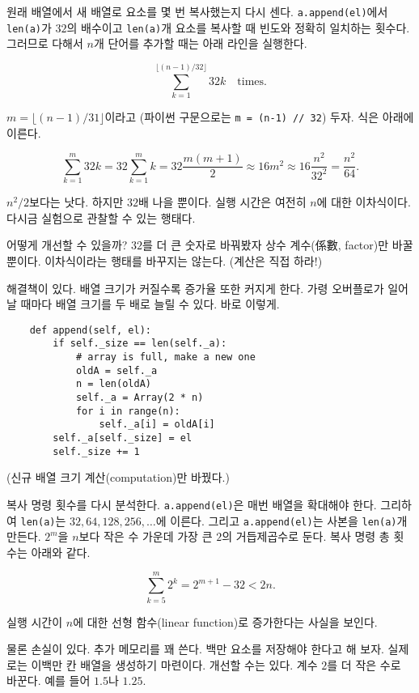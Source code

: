 \documentclass[a4paper]{oblivoir}
\begin{document}
원래 배열에서 새 배열로 요소를 몇 번 복사했는지 다시 센다. \texttt{a.append(el)}에서 \texttt{len(a)}가 $32$의 배수이고 \texttt{len(a)}개 요소를 복사할 때 빈도와 정확히 일치하는 횟수다. 그러므로 다해서 $n$개 단어를 추가할 때는 아래 라인을 실행한다.

$$\sum_{k=1}^{\lfloor(n-1)/32\rfloor}32k\quad\textrm{times.}$$

\noindent$m = \lfloor(n - 1)/31\rfloor$이라고 (파이썬 구문으로는 \texttt{m = (n-1) // 32}) 두자. 식은 아래에 이른다.

$$\sum_{k=1}^{m}32k=32\sum_{k=1}^{m}k=32\frac{m(m+1)}{2}\approx16m^2\approx16\frac{n^2}{32^2}=\frac{n^2}{64}.$$

\noindent$n^2/2$보다는 낫다. 하지만 $32$배 나을 뿐이다. 실행 시간은 여전히 $n$에 대한 이차식이다. 다시금 실험으로 관찰할 수 있는 행태다.

어떻게 개선할 수 있을까? $32$를 더 큰 숫자로 바꿔봤자 상수 계수(係數, factor)만 바꿀 뿐이다. 이차식이라는 행태를 바꾸지는 않는다. (계산은 직접 하라!)

해결책이 있다. 배열 크기가 커질수록 증가율 또한 커지게 한다. 가령 오버플로가 일어날 때마다 배열 크기를 두 배로 늘릴 수 있다. 바로 이렇게.

\begin{verbatim}
    def append(self, el):
        if self._size == len(self._a):
            # array is full, make a new one
            oldA = self._a
            n = len(oldA)
            self._a = Array(2 * n)
            for i in range(n):
                self._a[i] = oldA[i]
        self._a[self._size] = el
        self._size += 1
\end{verbatim}

\noindent(신규 배열 크기 계산(computation)만 바꿨다.)

복사 명령 횟수를 다시 분석한다. \texttt{a.append(el)}은 매번 배열을 확대해야 한다. 그리하여 \texttt{len(a)}는 $32,64,128,256,\ldots$에 이른다. 그리고 \texttt{a.append(el)}는 사본을 \texttt{len(a)}개 만든다. $2^m$을 $n$보다 작은 수 가운데 가장 큰 $2$의 거듭제곱수로 둔다. 복사 명령 총 횟수는 아래와 같다.

$$\sum_{k=5}^{m}2^k=2^{m+1}-32<2n.$$

 실행 시간이 $n$에 대한 선형 함수(linear function)로 증가한다는 사실을 보인다.

물론 손실이 있다. 추가 메모리를 꽤 쓴다. 백만 요소를 저장해야 한다고 해 보자. 실제로는 이백만 칸 배열을 생성하기 마련이다. 개선할 수는 있다. 계수 $2$를 더 작은 수로 바꾼다. 예를 들어 $1.5$나 $1.25$.  
\end{document}
